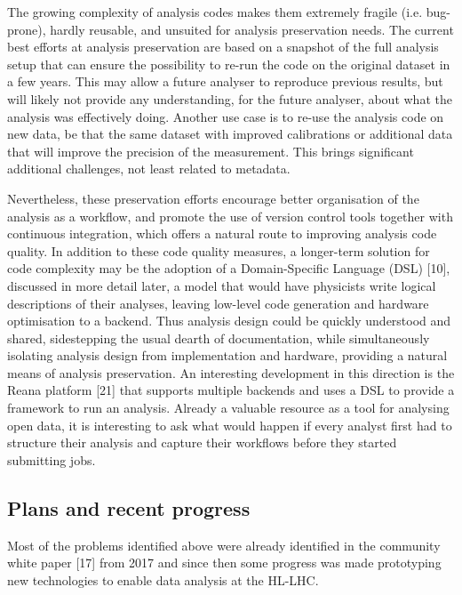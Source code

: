 \documentclass[11pt,a4paper]{article}
\begin{document}
The growing complexity of analysis codes makes them extremely fragile
(i.e. bug-prone), hardly reusable, and unsuited for analysis
preservation needs. The current best efforts at analysis preservation
are based on a snapshot of the full analysis setup that can ensure the
possibility to re-run the code on the original dataset in a few years.
This may allow a future analyser to reproduce previous results, but will
likely not provide any understanding, for the future analyser, about
what the analysis was effectively doing. Another use case is to re-use
the analysis code on new data, be that the same dataset with improved
calibrations or additional data that will improve the precision of the
measurement. This brings significant additional challenges, not least
related to metadata.

Nevertheless, these preservation efforts encourage better organisation
of the analysis as a workflow, and promote the use of version control
tools together with continuous integration, which offers a natural route
to improving analysis code quality. In addition to these code quality
measures, a longer-term solution for code complexity may be the adoption
of a Domain-Specific Language (DSL) {[}10{]}, discussed in more detail
later, a model that would have physicists write logical descriptions of
their analyses, leaving low-level code generation and hardware
optimisation to a backend. Thus analysis design could be quickly
understood and shared, sidestepping the usual dearth of documentation,
while simultaneously isolating analysis design from implementation and
hardware, providing a natural means of analysis preservation. An
interesting development in this direction is the Reana platform {[}21{]}
that supports multiple backends and uses a DSL to provide a framework to
run an analysis. Already a valuable resource as a tool for analysing
open data, it is interesting to ask what would happen if every analyst
first had to structure their analysis and capture their workflows before
they started submitting jobs.

\hypertarget{plans-and-recent-progress}{%
\subsection{Plans and recent progress}\label{plans-and-recent-progress}}

Most of the problems identified above were already identified in the
community white paper {[}17{]} from 2017 and since then some progress
was made prototyping new technologies to enable data analysis at the
HL-LHC.
\end{document}
